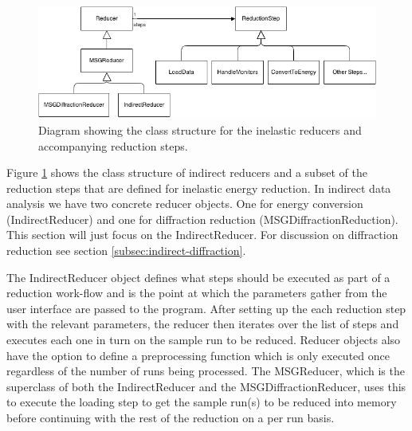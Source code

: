 \documentclass[paper=a4, fontsize=11pt]{scrartcl}	%
\numberwithin{equation}{section}															%
\numberwithin{figure}{section}																%
\numberwithin{table}{section}																%
\begin{document}
\begin{figure}[H]
\centering
\includegraphics[width=1\textwidth]{img/uml/class_diagrams/Reducer_structure.png}
\caption{Diagram showing the class structure for the inelastic reducers and accompanying reduction steps.}
\label{fig:reducer-structure-diagram}
\end{figure}

Figure \ref{fig:reducer-structure-diagram} shows the class structure of indirect reducers and a subset of the reduction steps that are defined for inelastic energy reduction. In indirect data analysis we have two concrete reducer objects. One for energy conversion (IndirectReducer) and one for diffraction reduction (MSGDiffractionReduction). This section will just focus on the IndirectReducer. For discussion on diffraction reduction see section \ref{subsec:indirect-diffraction}.

The IndirectReducer object defines what steps should be executed as part of a reduction work-flow and is the point at which the parameters gather from the user interface are passed to the program. After setting up the each reduction step with the relevant parameters, the reducer then iterates over the list of steps and executes each one in turn on the sample run to be reduced. Reducer objects also have the option to define a preprocessing function which is only executed once regardless of the number of runs being processed. The MSGReducer, which is the superclass of both the IndirectReducer and the MSGDiffractionReducer, uses this to execute the loading step to get the sample run(s) to be reduced into memory before continuing with the rest of the reduction on a per run basis.
\end{document}
